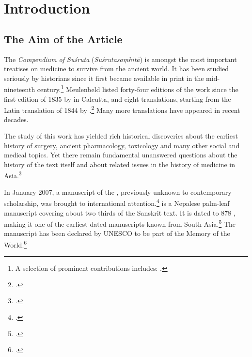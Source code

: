 \section{Introduction}

\subsection{The Aim of the Article}

The \emph{Compendium of Suśruta} (\emph{Suśrutasaṃhitā}) is amongst the most
important treatises on medicine to survive from the ancient world. It has been
studied seriously by historians since it first became available in print in the
mid-nineteenth century.\footnote{A selection of prominent contributions
includes: 
\cite{hoer-1897,hoer-1906a,hoer-1906b,hoer-1907a,hoer-1907,stra-1934,
sing-1972a,shar-1975, ray-1980, adri-1984,
yano-1986,meul-hist,shar-1999,vali-2007}.} %
 Meulenbeld listed
forty-four editions of the work since the first edition of 1835 by
\citeauthor{gupt-1835} in Calcutta, and eight translations,
starting from the Latin translation of 1844 by \citeauthor{hess-1855}.\footcite[IB, 
311\,ff.]{meul-hist}   Many more translations have appeared in recent decades.

The study of this work has yielded rich historical discoveries about 
the earliest history of surgery, ancient pharmacology, toxicology and many other 
social and medical topics. Yet there remain fundamental unanswered questions 
about the history of the text itself and about related issues in the history of 
medicine in Asia.\footcite[IA, 203–389]{meul-hist}

In January 2007, a manuscript of the \SS, previously unknown to contemporary
scholarship, was brought to international attention.\footcite{dimi-kais}
 is a Nepalese palm-leaf manuscript covering about two
thirds of the Sanskrit text. It is dated to 878 \CE, making it one of the
earliest dated manuscripts known from South Asia.\footcite[87–88]{hari-2011} The
manuscript has been declared by UNESCO to be part of the Memory of the 
World.\footcite{unes-2013}

